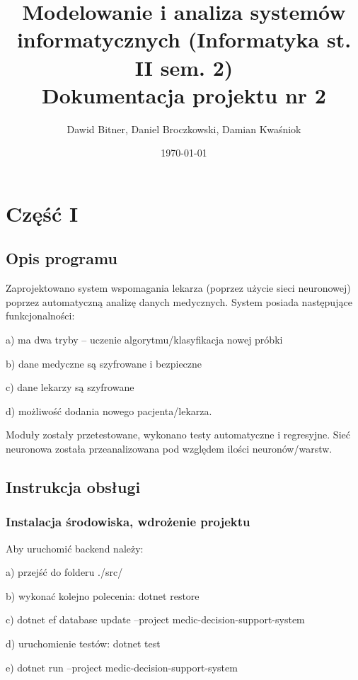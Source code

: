 \documentclass[12pt,a4paper]{article}
\begin{document}
	
	\title{Modelowanie i analiza systemów informatycznych (Informatyka st. II sem. 2)\\\small{Dokumentacja projektu nr 2}}
	\author{Dawid Bitner, Daniel Broczkowski, Damian Kwaśniok}
	\date{\today}

	\maketitle
	\newpage
	\section*{Część I}
	\subsection*{Opis programu}
	Zaprojektowano system wspomagania lekarza (poprzez użycie sieci neuronowej) poprzez automatyczną analizę danych medycznych. System posiada następujące funkcjonalności:
	
    a) ma dwa tryby -- uczenie algorytmu/klasyfikacja nowej próbki
    
    b) dane medyczne są szyfrowane i bezpieczne
    
    c) dane lekarzy są szyfrowane
    
    d) możliwość dodania nowego pacjenta/lekarza.
    
    Moduły zostały przetestowane, wykonano testy automatyczne i regresyjne. Sieć neuronowa została przeanalizowana pod względem ilości neuronów/warstw.
    
	\subsection*{Instrukcja obsługi}
    \subsubsection{Instalacja środowiska, wdrożenie projektu}
    Aby uruchomić backend należy:
    
    a) przejść do folderu ./src/
    
    b) wykonać kolejno polecenia: dotnet restore
    
    c) dotnet ef database update --project medic-decision-support-system
    
    d) uruchomienie testów: dotnet test
    
    e) dotnet run --project medic-decision-support-system
    
    
    
\end{document}
